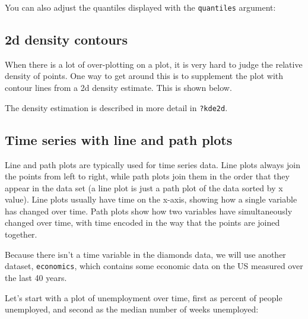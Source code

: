 % 

You can also adjust the quantiles displayed with the {\tt quantiles} argument:

% 

\subsection{2d density contours}

When there is a lot of over-plotting on a plot, it is very hard to judge the relative density of points.  One way to get around this is to supplement the plot with contour lines from a 2d density estimate.  This is shown below.

% 

The density estimation is described in more detail in {\tt ?kde2d}.

\subsection{Time series with line and path plots}\label{sub:line_plot}

Line and path plots are typically used for time series data.  Line plots always join the points from left to right, while path plots join them in the order that they appear in the data set (a line plot is just a path plot of the data sorted by x value).  Line plots usually have time on the x-axis, showing how a single variable has changed over time.  Path plots show how two variables have simultaneously changed over time, with time encoded in the way that the points are joined together.

Because there isn't a time variable in the diamonds data, we will use another dataset, {\tt economics}, which contains some economic data on the US measured over the last 40 years.

Let's start with a plot of unemployment over time, first as percent of people unemployed, and second as the median number of weeks unemployed:

% 

